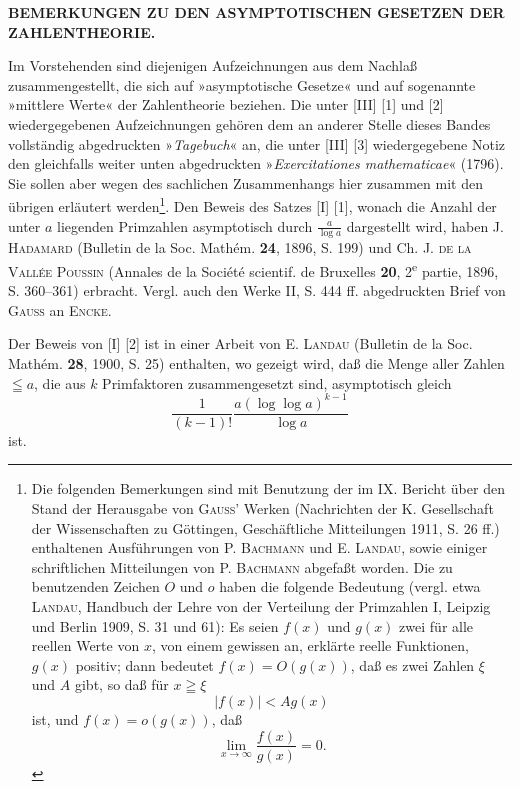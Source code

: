 \begin{center}\small\bfseries BEMERKUNGEN ZU DEN ASYMPTOTISCHEN GESETZEN DER ZAHLENTHEORIE.\end{center}
\begingroup\small\par\indent
Im Vorstehenden sind diejenigen Aufzeichnungen aus dem Nachlaß zusammengestellt, die sich auf »asymptotische Gesetze« und auf sogenannte »mittlere Werte« der Zahlentheorie beziehen. Die unter [III] [1] und [2] wiedergegebenen Aufzeichnungen gehören dem an anderer Stelle dieses Bandes vollständig abgedruckten »\textit{Tagebuch}« an, die unter [III] [3] wiedergegebene Notiz den gleichfalls weiter unten abgedruckten »\textit{Exercitationes mathematicae}« (1796). Sie sollen aber wegen des sachlichen Zusammenhangs hier zusammen mit den übrigen erläutert werden\footnote{Die folgenden Bemerkungen sind mit Benutzung der im IX. Bericht über den Stand der Herausgabe von \textsc{Gauss}' Werken (Nachrichten der K. Gesellschaft der Wissenschaften zu Göttingen, Geschäftliche Mitteilungen 1911, S. 26 ff.) enthaltenen Ausführungen von P. \textsc{Bachmann} und E. \textsc{Landau}, sowie einiger schriftlichen Mitteilungen von P. \textsc{Bachmann} abgefaßt worden. Die zu benutzenden Zeichen \(O\) und \(o\) haben die folgende Bedeutung (vergl. etwa \textsc{Landau}, Handbuch der Lehre von der Verteilung der Primzahlen I, Leipzig und Berlin 1909, S. 31 und 61): Es seien \(f(x)\) und \(g(x)\) zwei für alle reellen Werte von \(x\), von einem gewissen an, erklärte reelle Funktionen, \(g(x)\) positiv; dann bedeutet \(f(x)=O(g(x))\), daß es zwei Zahlen \(\xi\) und \(A\) gibt, so daß für \(x\geqq\xi\)
\[
|f(x)|<Ag(x)
\]
ist, und \(f(x)=o(g(x))\), daß
\[
\lim_{x\to\infty}\frac{f(x)}{g(x)}=0.
\]
}.
\clearpage
{}
Den Beweis des Satzes [I] [1], wonach die Anzahl der unter \(a\) liegenden Primzahlen asymptotisch durch \(\frac{a}{\log a}\) dargestellt wird, haben J. \textsc{Hadamard} (Bulletin de la Soc. Mathém. \textbf{24}, 1896, S. 199) und Ch. J. \textsc{de la Vallée Poussin} (Annales de la Société scientif. de Bruxelles \textbf{20}, 2\textsuperscript{e} partie, 1896, S. 360--361) erbracht. Vergl. auch den Werke II, S. 444 ff. abgedruckten Brief von \textsc{Gauss} an \textsc{Encke}.

Der Beweis von [I] [2] ist in einer Arbeit von E. \textsc{Landau} (Bulletin de la Soc. Mathém. \textbf{28}, 1900, S. 25) enthalten, wo gezeigt wird, daß die Menge aller Zahlen \(\leqq a\), die aus \(k\) Primfaktoren zusammengesetzt sind, asymptotisch gleich
\[
\frac1{(k-1)!}\frac{a(\log\log a)^{k-1}}{\log a}
\]
ist.

